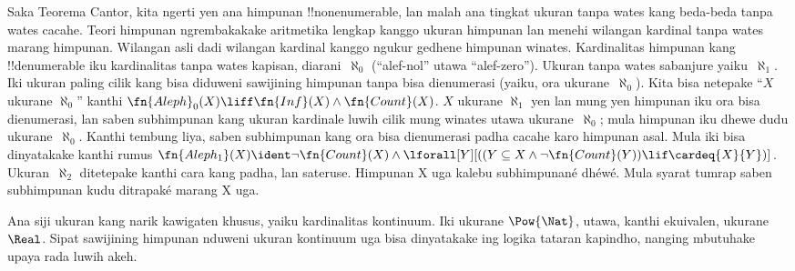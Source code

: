 \documentclass[../../../include/open-logic-section]{subfiles}
\begin{document}
Saka Teorema Cantor, kita ngerti yen ana himpunan
!!{nonenumerable}, lan malah ana tingkat ukuran tanpa
wates kang beda-beda tanpa wates cacahe. Teori himpunan
ngrembakakake aritmetika lengkap kanggo ukuran himpunan
lan menehi wilangan kardinal tanpa wates marang himpunan.
Wilangan asli dadi wilangan kardinal kanggo ngukur
gedhene himpunan winates. Kardinalitas himpunan kang
!!{denumerable} iku kardinalitas tanpa wates kapisan,
diarani~$\aleph_0$ (``alef-nol'' utawa
``alef-zero''). Ukuran tanpa wates sabanjure
yaiku~$\aleph_1$. Iki ukuran paling cilik kang bisa
diduweni sawijining himpunan tanpa bisa dienumerasi
(yaiku, ora ukurane~$\aleph_0$). Kita bisa netepake
``$X$ ukurane $\aleph_0$'' kanthi
$\fn{Aleph}_0(X) \liff \fn{Inf}(X) \land \fn{Count}(X)$.
$X$ ukurane $\aleph_1$ yen lan mung yen himpunan iku
ora bisa dienumerasi, lan saben subhimpunan kang ukuran
kardinale luwih cilik mung winates utawa ukurane~$\aleph_0$;
mula himpunan iku dhewe dudu ukurane~$\aleph_0$.
Kanthi tembung liya, saben subhimpunan kang ora bisa
dienumerasi padha cacahe karo himpunan asal.
Mula iki bisa dinyatakake kanthi rumus
$\fn{Aleph_1}(X) \ident \lnot \fn{Count}(X) \land
  \lforall[Y][((Y \subseteq X \land \lnot \fn{Count}(Y))
  \lif \cardeq{X}{Y})]$. Ukuran~$\aleph_2$
ditetepake kanthi cara kang padha, lan sateruse. Himpunan X uga kalebu subhimpunané dhéwé. Mula syarat tumrap saben subhimpunan kudu ditrapaké marang X uga.

Ana siji ukuran kang narik kawigaten khusus, yaiku
kardinalitas kontinuum. Iki ukurane
$\Pow{\Nat}$, utawa, kanthi ekuivalen,
ukurane~$\Real$. Sipat sawijining himpunan
nduweni ukuran kontinuum uga bisa dinyatakake ing
logika tataran kapindho, nanging mbutuhake upaya
rada luwih akeh.
\end{document}
